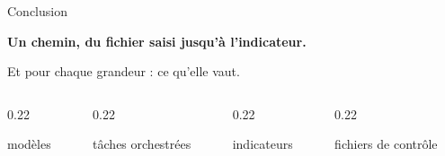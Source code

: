 \documentclass[aspectratio=169,11pt]{beamer}
\begin{document}
\begin{frame}{Conclusion}
  \vspace{6mm}
  \begin{center}
    \begin{minipage}{0.84\textwidth}
      \centering
      {\Large\color{accentgarde}\textbf{Un chemin, du fichier saisi jusqu'à l'indicateur.}\par}
      \vspace{3mm}
      {\large Et pour chaque grandeur : ce qu'elle vaut.\par}
    \end{minipage}
  \end{center}
  \vspace{8mm}
  \begin{columns}[T]
    \begin{column}{0.22\textwidth}\centering
      \par\small modèles
    \end{column}
    \begin{column}{0.22\textwidth}\centering
      \par\small tâches orchestrées
    \end{column}
    \begin{column}{0.22\textwidth}\centering
      \par\small indicateurs
    \end{column}
    \begin{column}{0.22\textwidth}\centering
      \par\small fichiers de contrôle
    \end{column}
  \end{columns}
  \vspace{10mm}
  \begin{center}
  \end{center}
\end{frame}
\end{document}
